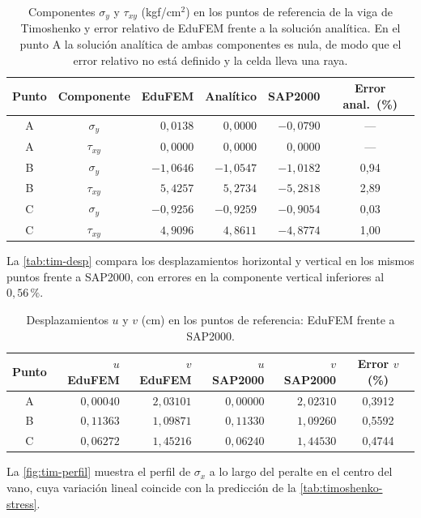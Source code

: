 \begin{table}[htbp]
\centering
\caption[Componentes $\sigma_y$ y $\tau_{xy}$ en los puntos de referencia de la viga de Timoshenko.]{Componentes $\sigma_y$ y $\tau_{xy}$ (kgf/cm$^2$) en los puntos de referencia de la viga de Timoshenko y error relativo de EduFEM frente a la solución analítica. En el punto A la solución analítica de ambas componentes es nula, de modo que el error relativo no está definido y la celda lleva una raya.}
\label{tab:tim-componentes}
\begin{tabular}{c c r r r c}
\hline
Punto & Componente & EduFEM & Analítico & SAP2000 & Error anal.\ (\%) \\
\hline
A & $\sigma_y$  & $0{,}0138$  & $0{,}0000$  & $-0{,}0790$ & --- \\
A & $\tau_{xy}$ & $0{,}0000$  & $0{,}0000$  & $0{,}0000$  & --- \\
B & $\sigma_y$  & $-1{,}0646$ & $-1{,}0547$ & $-1{,}0182$ & 0,94 \\
B & $\tau_{xy}$ & $5{,}4257$  & $5{,}2734$  & $-5{,}2818$ & 2,89 \\
C & $\sigma_y$  & $-0{,}9256$ & $-0{,}9259$ & $-0{,}9054$ & 0,03 \\
C & $\tau_{xy}$ & $4{,}9096$  & $4{,}8611$  & $-4{,}8774$ & 1,00 \\
\hline
\end{tabular}
\end{table}

La \autoref{tab:tim-desp} compara los desplazamientos horizontal y vertical en los mismos puntos frente a SAP2000, con errores en la componente vertical inferiores al $0{,}56\,\%$.

\begin{table}[htbp]
\centering
\caption{Desplazamientos $u$ y $v$ (cm) en los puntos de referencia: EduFEM frente a SAP2000.}
\label{tab:tim-desp}
\begin{tabular}{c r r r r c}
\hline
Punto & $u$ EduFEM & $v$ EduFEM & $u$ SAP2000 & $v$ SAP2000 & Error $v$ (\%) \\
\hline
A & $0{,}00040$ & $2{,}03101$ & $0{,}00000$ & $2{,}02310$ & 0,3912 \\
B & $0{,}11363$ & $1{,}09871$ & $0{,}11330$ & $1{,}09260$ & 0,5592 \\
C & $0{,}06272$ & $1{,}45216$ & $0{,}06240$ & $1{,}44530$ & 0,4744 \\
\hline
\end{tabular}
\end{table}

La \autoref{fig:tim-perfil} muestra el perfil de $\sigma_x$ a lo largo del peralte en el centro del vano, cuya variación lineal coincide con la predicción de la \autoref{tab:timoshenko-stress}.

